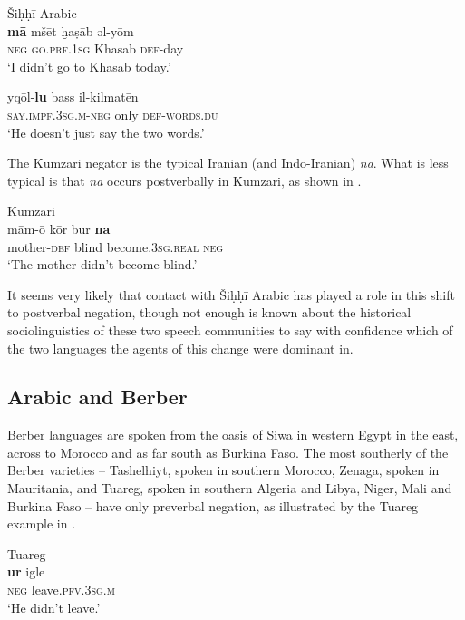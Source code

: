 \documentclass[output=paper]{langsci/langscibook}
\begin{document}
\ea
{Šiḥḥī Arabic \citep[87]{Bernabela2011}}\\
\ea\gll \textbf{mā} mšēt ḫaṣāb əl-yōm\label{ex:key:shi.a}\\
     \textsc{neg} \textsc{\textup{go.}}\textsc{prf.1sg} Khasab \textsc{def-}day  \\
\glt ‘I didn’t go to Khasab today.’

\ex\gll yqōl-\textbf{lu} bass il-kilmatēn\label{ex:key:shi.b}\\
     \textsc{\textup{say.}}\textsc{impf.3sg.m-}\textsc{neg} only \textsc{def-}\textsc{\textup{words.}}\textsc{du}\\
\glt ‘He doesn’t just say the two words.’
\z
\z

The Kumzari negator is the typical Iranian (and Indo-Iranian) \textit{na}. What is less typical is that \textit{na} occurs postverbally in Kumzari, as shown in .

\ea\label{ex:key:kum}
{       Kumzari \citep[211]{WalAnonbyforthcoming}}\\
\gll mām-ō kōr bur \textbf{na}\\
     mother\textsc{{}-def} blind become.3\textsc{sg.real} \textsc{neg} \\
\glt ‘The mother didn’t become blind.’
\z

It seems very likely that contact with Šiḥḥī Arabic has played a role in this shift to postverbal negation, though not enough is known about the historical sociolinguistics of these two speech communities to say with confidence which of the two languages the agents of this change were dominant in.



\subsection{Arabic and Berber}


Berber languages are spoken from the oasis of Siwa in western Egypt in the east, across to Morocco and as far south as Burkina Faso. The most southerly of the Berber varieties – Tashelhiyt, spoken in southern Morocco, Zenaga, spoken in Mauritania, and Tuareg, spoken in southern Algeria and Libya, Niger, Mali and Burkina Faso – have only preverbal negation, as illustrated by the Tuareg example in .


\ea\label{ex:key:tua}
{       Tuareg \citep[10]{Chaker1996}}\\
\gll \textbf{ur} igle\\
     \textsc{neg} leave\textsc{.pfv.3sg.m}\\
\glt ‘He didn’t leave.’
\z
\end{document}
